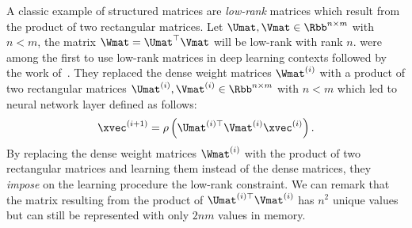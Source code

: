 A classic example of structured matrices are \emph{low-rank} matrices which result from the product of two rectangular matrices.
Let $\Umat, \Vmat \in \Rbb^{n \times m}$ with $n < m$, the matrix $\Wmat = \Umat^\top \Vmat$ will be low-rank with rank $n$.
\citet{denil2013predicting} were among the first to use low-rank matrices in deep learning contexts followed by the work of~\citet{jaderberg2014speeding,yu2017compressing}.
They replaced the dense weight matrices $\Wmat^{(i)}$ with a product of two rectangular matrices $\Umat^{(i)}, \Vmat^{(i)} \in \Rbb^{n \times m}$ with $n < m$ which led to neural network layer defined as follows:
\begin{equation}
  \xvec^{(i+1)} = \rho\left( \Umat^{(i)\top} \Vmat^{(i)} \xvec^{(i)} \right) .
\end{equation}
By replacing the dense weight matrices $\Wmat^{(i)}$ with the product of two rectangular matrices and learning them instead of the dense matrices, they \emph{impose} on the learning procedure the low-rank constraint.
We can remark that the matrix resulting from the product of $\Umat^{(i)\top} \Vmat^{(i)}$ has $n^2$ unique values but can still be represented with only $2nm$ values in memory.

